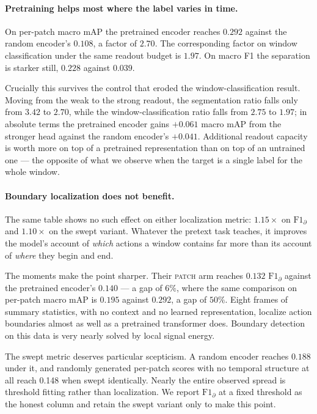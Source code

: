 \paragraph{Pretraining helps most where the label varies in time.}
On per-patch macro mAP the pretrained encoder reaches $0.292$ against the random
encoder's $0.108$, a factor of $2.70$. The corresponding factor on window classification
under the same readout budget is $1.97$. On macro F1 the separation is starker still,
$0.228$ against $0.039$.

Crucially this survives the control that eroded the window-classification result. Moving
from the weak to the strong readout, the segmentation ratio falls only from $3.42$ to
$2.70$, while the window-classification ratio falls from $2.75$ to $1.97$; in absolute
terms the pretrained encoder gains $+0.061$ macro mAP from the stronger head against the
random encoder's $+0.041$. Additional readout capacity is worth more on top of a
pretrained representation than on top of an untrained one --- the opposite of what we
observe when the target is a single label for the whole window.

\paragraph{Boundary localization does not benefit.}
The same table shows no such effect on either localization metric: $1.15\times$ on
$\text{F1}_\partial$ and $1.10\times$ on the swept variant. Whatever the pretext task
teaches, it improves the model's account of \emph{which} actions a window contains far
more than its account of \emph{where} they begin and end.

The moments make the point sharper. Their \textsc{patch} arm reaches $0.132$
$\text{F1}_\partial$ against the pretrained encoder's $0.140$ --- a gap of $6\%$, where the
same comparison on per-patch macro mAP is $0.195$ against $0.292$, a gap of $50\%$. Eight
frames of summary statistics, with no context and no learned representation, localize
action boundaries almost as well as a pretrained transformer does. Boundary detection on
this data is very nearly solved by local signal energy.

The swept metric deserves particular scepticism. A random encoder reaches $0.188$ under
it, and randomly generated per-patch scores with no temporal structure at all reach
0.148 when swept identically. Nearly the entire observed spread is threshold
fitting rather than localization. We report $\text{F1}_\partial$ at a fixed threshold as
the honest column and retain the swept variant only to make this point.

